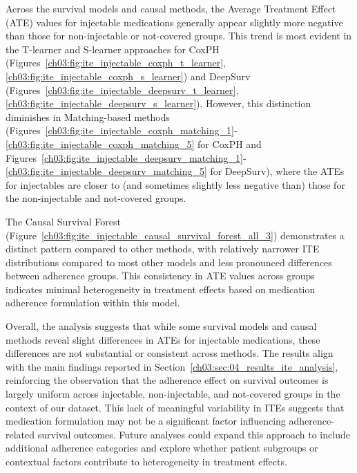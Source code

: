 Across the survival models and causal methods, the Average Treatment Effect (ATE) values for injectable medications generally appear slightly more negative than those for non-injectable or not-covered groups.
This trend is most evident in the T-learner and S-learner approaches for CoxPH (Figures~\ref{ch03:fig:ite_injectable_coxph_t_learner}, \ref{ch03:fig:ite_injectable_coxph_s_learner}) and DeepSurv (Figures~\ref{ch03:fig:ite_injectable_deepsurv_t_learner}, \ref{ch03:fig:ite_injectable_deepsurv_s_learner}).
However, this distinction diminishes in Matching-based methods (Figures~\ref{ch03:fig:ite_injectable_coxph_matching_1}-\ref{ch03:fig:ite_injectable_coxph_matching_5} for CoxPH and Figures~\ref{ch03:fig:ite_injectable_deepsurv_matching_1}-\ref{ch03:fig:ite_injectable_deepsurv_matching_5} for DeepSurv), where the ATEs for injectables are closer to (and sometimes slightly less negative than) those for the non-injectable and not-covered groups.

The Causal Survival Forest (Figure~\ref{ch03:fig:ite_injectable_causal_survival_forest_all_3}) demonstrates a distinct pattern compared to other methods, with relatively narrower ITE distributions compared to most other models and less pronounced differences between adherence groups.
This consistency in ATE values across groups indicates minimal heterogeneity in treatment effects based on medication adherence formulation within this model.

Overall, the analysis suggests that while some survival models and causal methods reveal slight differences in ATEs for injectable medications, these differences are not substantial or consistent across methods.
The results align with the main findings reported in Section~\ref{ch03:sec:04_results_ite_analysis}, reinforcing the observation that the adherence effect on survival outcomes is largely uniform across injectable, non-injectable, and not-covered groups in the context of our dataset.
This lack of meaningful variability in ITEs suggests that medication formulation may not be a significant factor influencing adherence-related survival outcomes.
Future analyses could expand this approach to include additional adherence categories and explore whether patient subgroups or contextual factors contribute to heterogeneity in treatment effects.



